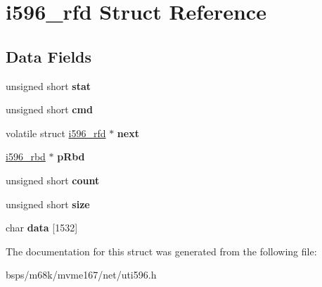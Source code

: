 \hypertarget{structi596__rfd}{}\section{i596\+\_\+rfd Struct Reference}
\label{structi596__rfd}
\subsection*{Data Fields}
\begin{DoxyCompactItemize}
\item 
\mbox{\label{structi596__rfd_af74874d9614f4a87847526f6b2ec1ce5}} 
unsigned short {\bfseries stat}
\item 
\mbox{\label{structi596__rfd_a31b802eb47afcec89ca6b189f3ff1dbf}} 
unsigned short {\bfseries cmd}
\item 
\mbox{\label{structi596__rfd_a4eb659df8ba6bea7a775d5a84fa86e1b}} 
volatile struct \mbox{\hyperlink{structi596__rfd}{i596\+\_\+rfd}} $\ast$ {\bfseries next}
\item 
\mbox{\label{structi596__rfd_a309221ce4547661d4b435647cec803d3}} 
\mbox{\hyperlink{structi596__rbd}{i596\+\_\+rbd}} $\ast$ {\bfseries p\+Rbd}
\item 
\mbox{\label{structi596__rfd_a45fbd056fd55a1f108cd8678be3fc6d6}} 
unsigned short {\bfseries count}
\item 
\mbox{\label{structi596__rfd_a3f582cd81c24cafb5ed9cfa50b746784}} 
unsigned short {\bfseries size}
\item 
\mbox{\label{structi596__rfd_a35cd257f15586cf199b0d734c0603f7b}} 
char {\bfseries data} \mbox{[}1532\mbox{]}
\end{DoxyCompactItemize}


The documentation for this struct was generated from the following file\+:\begin{DoxyCompactItemize}
\item 
bsps/m68k/mvme167/net/uti596.\+h\end{DoxyCompactItemize}
